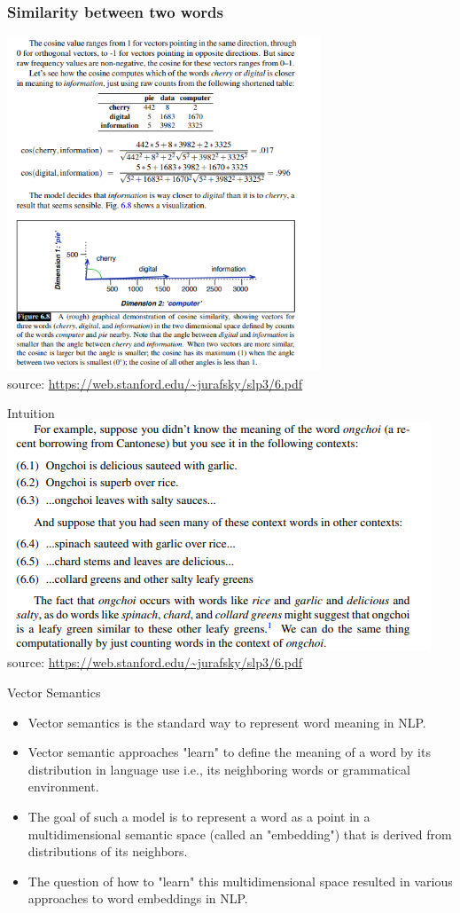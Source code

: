 \documentclass{beamer}
\begin{document}
\begin{frame}
\frametitle{Similarity between two words}
\includegraphics[width=0.7\textwidth]{figures/cosine.PNG}
\\ \tiny source: \url{https://web.stanford.edu/~jurafsky/slp3/6.pdf}
\end{frame}

\begin{frame}{Intuition}
\includegraphics[width=\textwidth]{figures/ongchoi.PNG}
\\ \tiny source: \url{https://web.stanford.edu/~jurafsky/slp3/6.pdf}
\end{frame}

\begin{frame}{Vector Semantics}
    \begin{itemize}
        \item Vector semantics is the standard way to represent word meaning in NLP.
        \item Vector semantic approaches "learn" to define the meaning of a word by its distribution in language use i.e., its neighboring words or grammatical environment. \pause
        \item The goal of such a model is to represent a word as a point in a multidimensional semantic space (called an "embedding") that is derived from distributions of its neighbors.
        \item The question of how to "learn" this multidimensional space resulted in various approaches to word embeddings in NLP.
    \end{itemize}
\end{frame}
\end{document}
